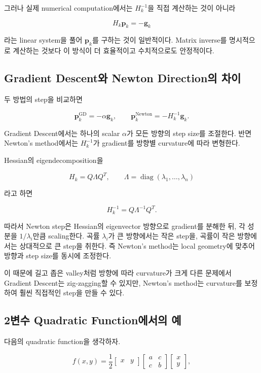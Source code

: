 \documentclass[11pt,a4paper]{article}
\begin{document}
그러나 실제 numerical computation에서는 $H_k^{-1}$을 직접 계산하는 것이 아니라

\[
    H_k\mathbf{p}_k=-\mathbf{g}_k
\]

라는 linear system을 풀어 $\mathbf{p}_k$를 구하는 것이 일반적이다.
Matrix inverse를 명시적으로 계산하는 것보다 이 방식이 더 효율적이고
수치적으로도 안정적이다.

\subsection{Gradient Descent와 Newton Direction의 차이}

두 방법의 step을 비교하면

\[
    \mathbf{p}_k^{\mathrm{GD}}
    =
    -\alpha\mathbf{g}_k,
    \qquad
    \mathbf{p}_k^{\mathrm{Newton}}
    =
    -H_k^{-1}\mathbf{g}_k.
\]

Gradient Descent에서는 하나의 scalar $\alpha$가 모든 방향의 step size를 조절한다.
반면 Newton's method에서는 $H_k^{-1}$가 gradient를 방향별 curvature에 따라 변형한다.

Hessian의 eigendecomposition을

\[
    H_k=Q\Lambda Q^T,
    \qquad
    \Lambda
    =
    \operatorname{diag}(\lambda_1,\ldots,\lambda_n)
\]

라고 하면

\[
    H_k^{-1}
    =
    Q\Lambda^{-1}Q^T.
\]

따라서 Newton step은 Hessian의 eigenvector 방향으로 gradient를 분해한 뒤,
각 성분을 $1/\lambda_i$만큼 scaling한다. 곡률 $\lambda_i$가 큰 방향에서는
작은 step을, 곡률이 작은 방향에서는 상대적으로 큰 step을 취한다.
즉 Newton's method는 local geometry에 맞추어 방향과 step size를 동시에 조정한다.

이 때문에 길고 좁은 valley처럼 방향에 따라 curvature가 크게 다른 문제에서
Gradient Descent는 zig-zagging할 수 있지만, Newton's method는 curvature를
보정하여 훨씬 직접적인 step을 만들 수 있다.

\subsection{2변수 Quadratic Function에서의 예}

다음의 quadratic function을 생각하자.

\[
    f(x,y)
    =
    \frac12
    \begin{bmatrix}
    x & y
    \end{bmatrix}
    \begin{bmatrix}
    a & c\\
    c & b
    \end{bmatrix}
    \begin{bmatrix}
    x\\y
    \end{bmatrix},
\]
\end{document}
